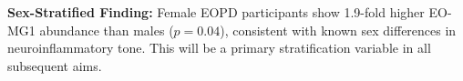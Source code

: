 \par\vspace{6pt}

\begin{tcolorbox}[warnbox]
  {\fontsize{8}{10}\selectfont\color{cihrRed}\textbf{\faExclamationTriangle\enspace Sex-Stratified Finding:}}
  {\fontsize{9}{11}\selectfont\quad Female EOPD participants show 1.9-fold higher EO-MG1 abundance than males ($p=0.04$), consistent with known sex differences in neuroinflammatory tone. This will be a primary stratification variable in all subsequent aims.}
\end{tcolorbox}

